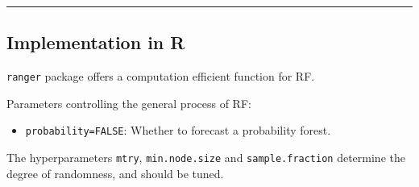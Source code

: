\documentclass[
  a4paper,
  twoside,
  openright]{book}
\newenvironment{Shaded}{\begin{snugshade}}{\end{snugshade}}
\newcommand{\AttributeTok}[1]{\textcolor[rgb]{0.13,0.29,0.53}{#1}}
\newcommand{\CommentTok}[1]{\textcolor[rgb]{0.56,0.35,0.01}{\textit{#1}}}
\newcommand{\ConstantTok}[1]{\textcolor[rgb]{0.56,0.35,0.01}{#1}}
\newcommand{\FunctionTok}[1]{\textcolor[rgb]{0.13,0.29,0.53}{\textbf{#1}}}
\newcommand{\NormalTok}[1]{#1}
\newcommand{\OtherTok}[1]{\textcolor[rgb]{0.56,0.35,0.01}{#1}}
\newcommand{\SpecialCharTok}[1]{\textcolor[rgb]{0.81,0.36,0.00}{\textbf{#1}}}
\newcommand{\StringTok}[1]{\textcolor[rgb]{0.31,0.60,0.02}{#1}}
\providecommand{\tightlist}{%
  \setlength{\itemsep}{0pt}\setlength{\parskip}{0pt}}
\theoremstyle{definition}
\theoremstyle{definition}
\theoremstyle{definition}
\theoremstyle{definition}
\theoremstyle{remark}
\begin{document}
\begin{center}\rule{0.5\linewidth}{0.5pt}\end{center}

\subsection*{Implementation in R}\label{implementation-in-r}

\texttt{ranger} package offers a computation efficient function for RF.

\begin{Shaded}
\end{Shaded}

Parameters controlling the general process of RF:

\begin{itemize}
\tightlist
\item
  \texttt{probability=FALSE}: Whether to forecast a probability forest.
\end{itemize}

The hyperparameters \texttt{mtry}, \texttt{min.node.size} and \texttt{sample.fraction} determine the degree of randomness, and should be tuned.
\end{document}
